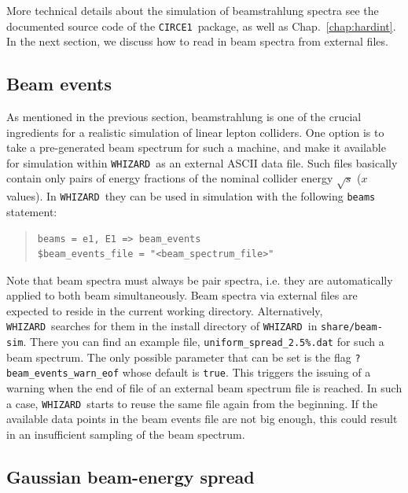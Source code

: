 \documentclass[12pt]{book}
\newcommand{\ttt}[1]{\texttt{#1}}
\newcommand{\whizard}{\ttt{WHIZARD}}
\newcommand{\circeone}{\ttt{CIRCE1}}
\begin{document}
More technical details about the simulation of beamstrahlung spectra
see the documented source code of the \circeone\ package, as well as
Chap.~\ref{chap:hardint}. In the next section, we discuss how to read
in beam spectra from external files.


\subsection{Beam events}
\label{sec:beamevents}

As mentioned in the previous section, beamstrahlung is one of the
crucial ingredients for a realistic simulation of linear lepton
colliders. One option is to take a pre-generated beam spectrum for
such a machine, and make it available for simulation within \whizard\
as an external ASCII data file. Such files basically contain only
pairs of energy fractions of the nominal collider energy $\sqrt{s}$
($x$ values). In \whizard\ they can be used in simulation with the
following \ttt{beams} statement:
\begin{quote}
\begin{footnotesize}
\begin{Verbatim}
beams = e1, E1 => beam_events
$beam_events_file = "<beam_spectrum_file>"
\end{Verbatim}
\end{footnotesize}%
\end{quote}
Note that beam spectra must always be pair spectra, i.e. they are
automatically applied to both beam simultaneously.
Beam spectra via external files are expected to reside in the current
working directory. Alternatively, \whizard\ searches for them in the
install directory of \whizard\ in \ttt{share/beam-sim}. There you can
find an example file, \ttt{uniform\_spread\_2.5\%.dat} for such a beam
spectrum. The only possible parameter that can be set is the flag
\ttt{?beam\_events\_warn\_eof} whose default is \ttt{true}. This
triggers the issuing of a warning when the end of file of an external
beam spectrum file is reached. In such a case, \whizard\ starts to
reuse the same file again from the beginning. If the available data
points in the beam events file are not big enough, this could result
in an insufficient sampling of the beam spectrum.


\subsection{Gaussian beam-energy spread}
\label{sec:gaussian}
\end{document}
